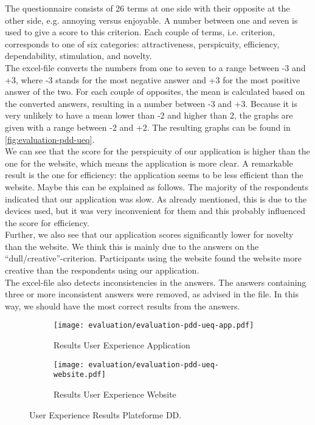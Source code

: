 The questionnaire consists of 26 terms at one side with their opposite at the other side, e.g. annoying versus enjoyable. A number between one and seven is used to give a score to this criterion. Each couple of terms, i.e. criterion, corresponds to one of six categories: attractiveness, perspicuity, efficiency, dependability, stimulation, and novelty.\\

The excel-file converts the numbers from one to seven to a range between -3 and +3, where -3 stands for the most negative answer and +3 for the most positive answer of the two. For each couple of opposites, the mean is calculated based on the converted answers, resulting in a number between -3 and +3. Because it is very unlikely to have a mean lower than -2 and higher than 2, the graphs are given with a range between -2 and +2. The resulting graphs can be found in \autoref{fig:evaluation-pdd-ueq}.\\

We can see that the score for the perspicuity of our application is higher than the one for the website, which means the application is more clear. A remarkable result is the one for efficiency: the application seems to be less efficient than the website. Maybe this can be explained as follows. The majority of the respondents indicated that our application was slow. As already mentioned, this is due to the devices used, but it was very inconvenient for them and this probably influenced the score for efficiency.\\

Further, we also see that our application scores significantly lower for novelty than the website. We think this is mainly due to the answers on the ``dull/creative''-criterion. Participants using the website found the website more creative than the respondents using our application.\\

The excel-file also detects inconsistencies in the answers. The answers containing three or more inconsistent answers were removed, as advised in the file. In this way, we should have the most correct results from the answers.

\begin{figure}[h]
	\centering
	\begin{subfigure}{.49\textwidth}
  		\centering
  		\texttt{[image: evaluation/evaluation-pdd-ueq-app.pdf]}
  		\caption{Results User Experience Application}
	\end{subfigure}%
	\begin{subfigure}{.49\textwidth}
  		\centering
  		\texttt{[image: evaluation/evaluation-pdd-ueq-website.pdf]}
  		\caption{Results User Experience Website}
	\end{subfigure}
	\caption{User Experience Results Plateforme DD.}
	\label{fig:evaluation-pdd-ueq}
\end{figure}



